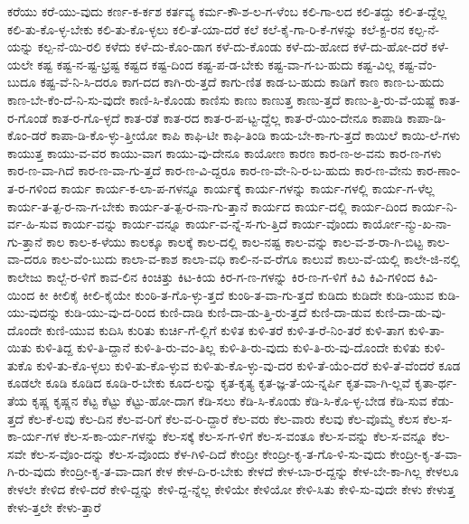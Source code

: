 {ಕರೆಯು
ಕರೆ-ಯು-ವುದು
ಕರ್ಣ-ಕ-ರ್ಕಶ
ಕರ್ತವ್ಯ
ಕರ್ಮ-ಕೌ-ಶ-ಲ-ಗ-ಳೆಂಬ
ಕಲಿ-ಗಾ-ಲದ
ಕಲಿ-ತದ್ದು
ಕಲಿ-ತ-ದ್ದೆಲ್ಲ
ಕಲಿ-ತು-ಕೊ-ಳ್ಳ-ಬೇಕು
ಕಲಿ-ತು-ಕೊ-ಳ್ಳಲು
ಕಲಿ-ತೆ-ಯಾ-ದರೆ
ಕಲೆ
ಕಲೆ-ಕೈ-ಗಾ-ರಿ-ಕೆ-ಗಳನ್ನು
ಕಲೆ-ಕ್ಟ-ರನ
ಕಲ್ಪ-ನೆ-ಯನ್ನು
ಕಲ್ಪ-ನೆ-ಯಿ-ರಲಿ
ಕಳೆದು
ಕಳೆ-ದು-ಕೊಂ-ಡಾಗ
ಕಳೆ-ದು-ಕೊಂಡು
ಕಳೆ-ದು-ಹೋದ
ಕಳೆ-ದು-ಹೋ-ದರೆ
ಕಳೆ-ಯಲೇ
ಕಷ್ಟ
ಕಷ್ಟ-ನ-ಷ್ಟ-ಭ್ರಷ್ಟ
ಕಷ್ಟದ
ಕಷ್ಟ-ದಿಂದ
ಕಷ್ಟ-ಪ-ಡ-ಬೇಕು
ಕಷ್ಟ-ವಾ-ಗ-ಬ-ಹುದು
ಕಷ್ಟ-ವಿಲ್ಲ
ಕಷ್ಟ-ವೆಂ-ಬುದೂ
ಕಷ್ಟ-ವೆ-ನಿ-ಸಿ-ದರೂ
ಕಾಗ-ದದ
ಕಾಗಿ-ರು-ತ್ತದೆ
ಕಾಗು-ಣಿತ
ಕಾಡ-ಬ-ಹುದು
ಕಾಡಿಗೆ
ಕಾಣ
ಕಾಣ-ಬ-ಹುದು
ಕಾಣ-ಬೇ-ಕೆಂ-ದೆ-ನಿ-ಸು-ವುದೇ
ಕಾಣಿ-ಸಿ-ಕೊಂಡು
ಕಾಣಿಸು
ಕಾಣು
ಕಾಣುತ್ತ
ಕಾಣು-ತ್ತದೆ
ಕಾಣು-ತ್ತಿ-ರು-ವೆ-ಯಷ್ಟೆ
ಕಾತ-ರ-ಗೊಂಡೆ
ಕಾತ-ರ-ಗೊ-ಳ್ಳದೆ
ಕಾತ-ರತೆ
ಕಾತ-ರದ
ಕಾತ-ರ-ಪ-ಟ್ಟ-ದ್ದೆಲ್ಲ
ಕಾತ-ರೆ-ಯಿಂ-ದೇನೂ
ಕಾಪಾಡಿ
ಕಾಪಾ-ಡಿ-ಕೊಂ-ಡರೆ
ಕಾಪಾ-ಡಿ-ಕೊ-ಳ್ಳು-ತ್ತೀಯೋ
ಕಾಪಿ
ಕಾಫಿ-ಟೀ
ಕಾಫಿ-ತಿಂಡಿ
ಕಾಯ-ಬೇ-ಕಾ-ಗು-ತ್ತದೆ
ಕಾಯಿಲೆ
ಕಾಯಿ-ಲೆ-ಗಳು
ಕಾಯುತ್ತ
ಕಾಯು-ವ-ವರ
ಕಾಯು-ವಾಗ
ಕಾಯು-ವು-ದೇನೂ
ಕಾಯೋಣ
ಕಾರಣ
ಕಾರ-ಣ-ಅ-ವನು
ಕಾರ-ಣ-ಗಳು
ಕಾರ-ಣ-ವಾ-ಗಿದೆ
ಕಾರ-ಣ-ವಾ-ಗು-ತ್ತದೆ
ಕಾರ-ಣ-ವಿ-ದ್ದರೂ
ಕಾರ-ಣ-ವೇ-ನಿ-ರ-ಬ-ಹುದು
ಕಾರ-ಣ-ವೇನು
ಕಾರ-ಣಾಂ-ತ-ರ-ಗಳಿಂದ
ಕಾರ್ಯ
ಕಾರ್ಯ-ಕ-ಲಾ-ಪ-ಗಳನ್ನೂ
ಕಾರ್ಯಕ್ಕೆ
ಕಾರ್ಯ-ಗಳನ್ನು
ಕಾರ್ಯ-ಗಳಲ್ಲಿ
ಕಾರ್ಯ-ಗ-ಳೆಲ್ಲ
ಕಾರ್ಯ-ತ-ತ್ಪ-ರ-ನಾ-ಗ-ಬೇಕು
ಕಾರ್ಯ-ತ-ತ್ಪ-ರ-ನಾ-ಗು-ತ್ತಾನೆ
ಕಾರ್ಯದ
ಕಾರ್ಯ-ದಲ್ಲಿ
ಕಾರ್ಯ-ದಿಂದ
ಕಾರ್ಯ-ನಿ-ರ್ವ-ಹಿ-ಸುವ
ಕಾರ್ಯ-ವನ್ನು
ಕಾರ್ಯ-ವನ್ನೂ
ಕಾರ್ಯ-ವ-ನ್ನೆ-ಸ-ಗು-ತ್ತಿದೆ
ಕಾರ್ಯ-ವೊಂದು
ಕಾರ್ಯೋ-ನ್ಮು-ಖ-ನಾ-ಗು-ತ್ತಾನೆ
ಕಾಲ
ಕಾಲ-ಕ-ಳೆಯು
ಕಾಲಕ್ಕೂ
ಕಾಲಕ್ಕೆ
ಕಾಲ-ದಲ್ಲಿ
ಕಾಲ-ನಷ್ಟ
ಕಾಲ-ವನ್ನು
ಕಾಲ-ವ-ಶ-ರಾ-ಗಿ-ಬಿಟ್ಟ
ಕಾಲ-ವಾ-ದರೂ
ಕಾಲ-ವೆಂ-ಬುದು
ಕಾಲಾ-ವ-ಕಾಶ
ಕಾಲಾ-ವಧಿ
ಕಾಲಿ-ನ-ವ-ರೆಗೂ
ಕಾಲುವೆ
ಕಾಲು-ವೆ-ಯಲ್ಲಿ
ಕಾಲೇ-ಜಿ-ನಲ್ಲಿ
ಕಾಲೇಜು
ಕಾಲ್ಬೆ-ರ-ಳಿಗೆ
ಕಾವ-ಲಿನ
ಕಿಂಚಿತ್ತು
ಕಿಟ-ಕಿಯ
ಕಿರ-ಗ-ಣ-ಗಳನ್ನು
ಕಿರ-ಣ-ಗ-ಳಿಗೆ
ಕಿವಿ
ಕಿವಿ-ಗಳಿಂದ
ಕಿವಿ-ಯಿಂದ
ಕೀ
ಕೀಲಿಕೈ
ಕೀಲಿ-ಕೈಯೇ
ಕುಂಠಿ-ತ-ಗೊ-ಳ್ಳು-ತ್ತದೆ
ಕುಂಠಿ-ತ-ವಾ-ಗು-ತ್ತದೆ
ಕುಡಿದು
ಕುಡಿದೇ
ಕುಡಿ-ಯುವ
ಕುಡಿ-ಯು-ವುದನ್ನು
ಕುಡಿ-ಯು-ವು-ದ-ರಿಂದ
ಕುಣಿ-ದಾಡಿ
ಕುಣಿ-ದಾ-ಡು-ತ್ತಿ-ರು-ತ್ತದೆ
ಕುಣಿ-ದಾ-ಡುವ
ಕುಣಿ-ದಾ-ಡು-ವು-ದೊಂದೇ
ಕುಣಿ-ಯುವ
ಕುದಿಸಿ
ಕುರಿತು
ಕುರ್ಚಿ-ಗೆ-ಲ್ಲಿಗೆ
ಕುಳಿತ
ಕುಳಿ-ತರೆ
ಕುಳಿ-ತ-ರೆ-ನಿಂ-ತರೆ
ಕುಳಿ-ತಾಗ
ಕುಳಿ-ತಾ-ಯಿತು
ಕುಳಿ-ತಿದ್ದ
ಕುಳಿ-ತಿ-ದ್ದಾನೆ
ಕುಳಿ-ತಿ-ರು-ವಂ-ತಿಲ್ಲ
ಕುಳಿ-ತಿ-ರು-ವುದು
ಕುಳಿ-ತಿ-ರು-ವು-ದೊಂದೇ
ಕುಳಿತು
ಕುಳಿ-ತುಕೊ
ಕುಳಿ-ತು-ಕೊ-ಳ್ಳಲು
ಕುಳಿ-ತು-ಕೊ-ಳ್ಳುವ
ಕುಳಿ-ತು-ಕೊ-ಳ್ಳು-ವು-ದರ
ಕುಳಿ-ತೆ-ಯೆಂ-ದರೆ
ಕುಳಿ-ತೆ-ವೆಂದರೆ
ಕೂಡ
ಕೂಡಲೇ
ಕೂಡಿ
ಕೂಡಿದ
ಕೂಡಿ-ರ-ಬೇಕು
ಕೂದ-ಲನ್ನು
ಕೃತ-ಕೃತ್ಯ
ಕೃತ-ಜ್ಞ-ತೆ-ಯ-ನ್ನರ್ಪಿ
ಕೃತ-ವಾ-ಗಿ-ಲ್ಲವೆ
ಕೃತಾ-ರ್ಥ-ತೆಯ
ಕೃಷ್ಣ
ಕೃಷ್ಣನ
ಕೆಟ್ಟ
ಕೆಟ್ಟು
ಕೆಟ್ಟು-ಹೋ-ದಾಗ
ಕೆಡಿ-ಸಲು
ಕೆಡಿ-ಸಿ-ಕೊಂಡು
ಕೆಡಿ-ಸಿ-ಕೊ-ಳ್ಳ-ಬೇಡ
ಕೆಡಿ-ಸುವ
ಕೆಡು-ತ್ತದೆ
ಕೆಲ-ಕೆ-ಲವು
ಕೆಲ-ದಿನ
ಕೆಲ-ವ-ರಿಗೆ
ಕೆಲ-ವ-ರಿ-ದ್ದಾರೆ
ಕೆಲ-ವರು
ಕೆಲ-ವಾರು
ಕೆಲವು
ಕೆಲ-ವೊಮ್ಮೆ
ಕೆಲಸ
ಕೆಲ-ಸ-ಕಾ-ರ್ಯ-ಗಳ
ಕೆಲ-ಸ-ಕಾ-ರ್ಯ-ಗಳನ್ನು
ಕೆಲ-ಸಕ್ಕೆ
ಕೆಲ-ಸ-ಗ-ಳಿಗೆ
ಕೆಲ-ಸ-ವಂತೂ
ಕೆಲ-ಸ-ವನ್ನು
ಕೆಲ-ಸ-ವನ್ನೂ
ಕೆಲ-ಸವೇ
ಕೆಲ-ಸ-ವೊಂ-ದನ್ನು
ಕೆಲ-ಸ-ವೊಂದು
ಕೆಳ-ಗಿಳಿ-ದಿದೆ
ಕೇಂದ್ರೀ
ಕೇಂದ್ರೀ-ಕೃ-ತ-ಗೊ-ಳಿ-ಸು-ವುದು
ಕೇಂದ್ರೀ-ಕೃ-ತ-ವಾ-ಗಿ-ರು-ವುದು
ಕೇಂದ್ರೀ-ಕೃ-ತ-ವಾ-ದಾಗ
ಕೇಳ
ಕೇಳ-ದಿ-ರ-ಬೇಕು
ಕೇಳದೆ
ಕೇಳ-ಬಾ-ರ-ದ್ದನ್ನು
ಕೇಳ-ಬೇ-ಕಾ-ಗಿಲ್ಲ
ಕೇಳಲೂ
ಕೇಳಲೇ
ಕೇಳಿದ
ಕೇಳಿ-ದರೆ
ಕೇಳಿ-ದ್ದನ್ನು
ಕೇಳಿ-ದ್ದ-ನ್ನೆಲ್ಲ
ಕೇಳಿಯೇ
ಕೇಳಿಯೋ
ಕೇಳಿ-ಸಿತು
ಕೇಳಿ-ಸು-ವುದೇ
ಕೇಳು
ಕೇಳುತ್ತ
ಕೇಳು-ತ್ತಲೇ
ಕೇಳು-ತ್ತಾರೆ
}
